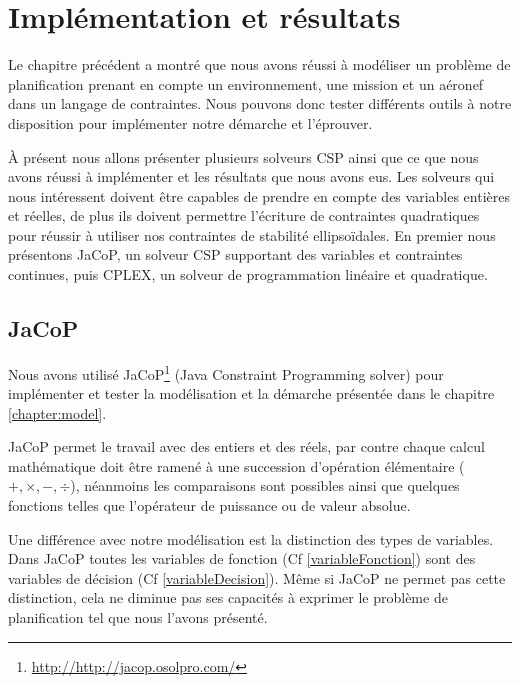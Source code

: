\chapter{Implémentation et résultats}
Le chapitre précédent a montré que nous avons réussi à modéliser un problème de planification prenant en compte un environnement, une mission et un aéronef dans un langage de contraintes. Nous pouvons donc tester différents outils à notre disposition pour implémenter notre démarche et l'éprouver.

\`A présent nous allons présenter plusieurs solveurs CSP ainsi que ce que nous avons réussi à implémenter et les résultats que nous avons eus. Les solveurs qui nous intéressent doivent être capables de prendre en compte des variables entières et réelles, de plus ils doivent permettre l'écriture de contraintes quadratiques pour réussir à utiliser nos contraintes de stabilité ellipsoïdales.
En premier nous présentons JaCoP, un solveur CSP supportant des variables et contraintes continues, puis CPLEX, un solveur de programmation linéaire et quadratique.

\section{JaCoP}
Nous avons utilisé JaCoP\footnote{\url{http://http://jacop.osolpro.com/}} (Java Constraint Programming solver) pour implémenter et tester la modélisation et la démarche présentée dans le chapitre \ref{chapter:model}. 

JaCoP permet le travail avec des entiers et des réels, par contre chaque calcul mathématique doit être ramené à une succession d'opération élémentaire ($+, \times, -, \div$), néanmoins les comparaisons sont possibles ainsi que quelques fonctions telles que l'opérateur de puissance ou de valeur absolue.

Une différence avec notre modélisation est la distinction des types de variables. Dans JaCoP toutes les variables de fonction (Cf \ref{variableFonction}) sont des variables de décision (Cf \ref{variableDecision}). Même si JaCoP ne permet pas cette distinction, cela ne diminue pas ses capacités à exprimer le problème de planification tel que nous l'avons présenté.


